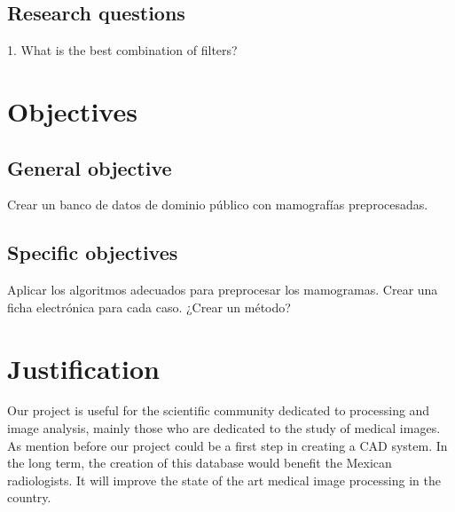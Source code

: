 \subsection{Research questions}

1. What is the best combination of filters?

\section{Objectives}
\subsection{General objective}

Crear un banco de datos de dominio público con mamografías preprocesadas.

\subsection{Specific objectives}

Aplicar los algoritmos adecuados para preprocesar los mamogramas.
Crear una ficha electrónica para cada caso.
¿Crear un método?

\section{Justification}

Our project is useful for the scientific community dedicated to processing and
image analysis, mainly those who are dedicated to the study of medical images.
As mention before our project could be a first step in creating a CAD system.
In the long term, the creation of this database would benefit the Mexican
radiologists. It will improve the state of the art medical image processing in
the country.

